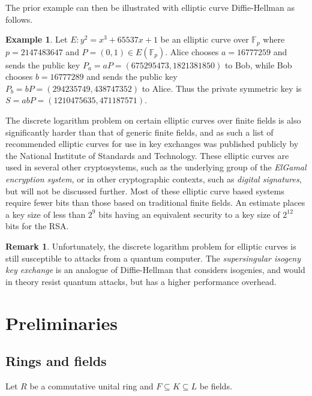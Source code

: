 \documentclass{article}
\newcommand{\F}{\mathbb{F}}
\newcommand{\rb}[1]{\left( #1 \right)}
\theoremstyle{definition}
\newtheorem*{example}{Example}
\newtheorem*{remark}{Remark}
\begin{document}
The prior example can then be illustrated with elliptic curve Diffie-Hellman as follows.

\begin{example}
Let $ E : y^2 = x^3 + 65537x + 1 $ be an elliptic curve over $ \F_p $ where $ p = 2147483647 $ and $ P = \rb{0, 1} \in E\rb{\F_p} $. Alice chooses $ a = 16777259 $ and sends the public key $ P_a = aP = \rb{675295473, 1821381850} $ to Bob, while Bob chooses $ b = 16777289 $ and sends the public key $ P_b = bP = \rb{294235749, 438747352} $ to Alice. Thus the private symmetric key is $ S = abP = \rb{1210475635, 471187571} $.
\end{example}

The discrete logarithm problem on certain elliptic curves over finite fields is also significantly harder than that of generic finite fields, and as such a list of recommended elliptic curves for use in key exchanges was published publicly by the National Institute of Standards and Technology. These elliptic curves are used in several other cryptosystems, such as the underlying group of the \emph{ElGamal encryption system}, or in other cryptographic contexts, such as \emph{digital signatures}, but will not be discussed further. Most of these elliptic curve based systems require fewer bits than those based on traditional finite fields. An estimate places a key size of less than $ 2^9 $ bits having an equivalent security to a key size of $ 2^{12} $ bits for the RSA.

\begin{remark}
Unfortunately, the discrete logarithm problem for elliptic curves is still susceptible to attacks from a quantum computer. The \emph{supersingular isogeny key exchange} is an analogue of Diffie-Hellman that considers isogenies, and would in theory resist quantum attacks, but has a higher performance overhead.
\end{remark}

\pagebreak

\appendix

\section{Preliminaries}

\subsection{Rings and fields}

Let $ R $ be a commutative unital ring and $ F \subseteq K \subseteq L $ be fields.
\end{document}
